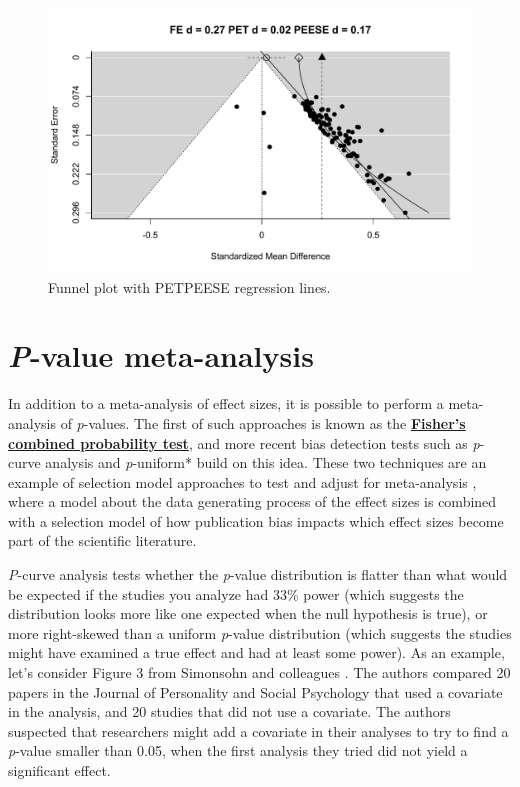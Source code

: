 \documentclass[
  oneside]{book}
\begin{document}
\begin{figure}

{\centering \includegraphics[width=1\linewidth]{12-bias_files/figure-latex/petpeese-1} 

}

\caption{Funnel plot with PETPEESE regression lines.}\label{fig:petpeese}
\end{figure}

\hypertarget{p-value-meta-analysis}{%
\section{\texorpdfstring{\emph{P}-value meta-analysis}{P-value meta-analysis}}\label{p-value-meta-analysis}}

In addition to a meta-analysis of effect sizes, it is possible to perform a meta-analysis of \emph{p}-values. The first of such approaches is known as the \href{https://en.wikipedia.org/wiki/Fisher\%27s_method}{\textbf{Fisher's combined probability test}}, and more recent bias detection tests such as \emph{p}-curve analysis \citep{simonsohn_p-curve_2014} and \emph{p}-uniform* \citep{aert_correcting_2018} build on this idea. These two techniques are an example of selection model approaches to test and adjust for meta-analysis \citep{iyengar_selection_1988}, where a model about the data generating process of the effect sizes is combined with a selection model of how publication bias impacts which effect sizes become part of the scientific literature.

\emph{P}-curve analysis tests whether the \emph{p}-value distribution is flatter than what would be expected if the studies you analyze had 33\% power (which suggests the distribution looks more like one expected when the null hypothesis is true), or more right-skewed than a uniform \emph{p}-value distribution (which suggests the studies might have examined a true effect and had at least some power). As an example, let's consider Figure 3 from Simonsohn and colleagues \citeyearpar{simonsohn_p-curve_2014}. The authors compared 20 papers in the Journal of Personality and Social Psychology that used a covariate in the analysis, and 20 studies that did not use a covariate. The authors suspected that researchers might add a covariate in their analyses to try to find a \emph{p}-value smaller than 0.05, when the first analysis they tried did not yield a significant effect.
\end{document}

